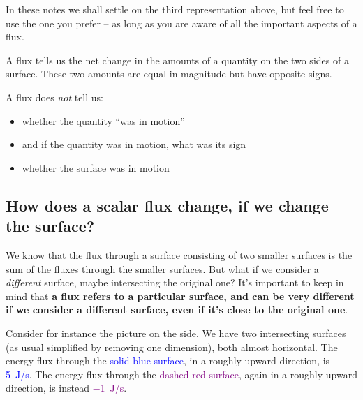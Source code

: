\documentclass[a4paper,12pt,%
onecolumn,oneside,titlepage,%
british%
]{memoir}
\renewcommand*{\|}[1][]{\nonscript\:#1\vert\nonscript\:\mathopen{}}
\begin{document}
In these notes we shall settle on the third representation above, but feel free to use the one you prefer -- as long as you are aware of all the important aspects of a flux.
\begin{warning}
  A flux tells us the net change in the amounts of a quantity on the two sides of a surface. These two amounts are equal in magnitude but have opposite signs.

  \smallskip

  A flux does \emph{not} tell us:
  \begin{itemize}\tightlist
  \item whether the quantity \enquote{was in motion}
  \item \textellipsis and if the quantity was in motion, what was its sign
  \item whether the surface was in motion
  \end{itemize}
\end{warning}

\subsection{How does a scalar flux change, if we change the surface?}
\label{sec:surface_change_scalar}

We know that the flux through a surface consisting of two smaller surfaces is the sum of the fluxes through the smaller surfaces. But what if we consider a \emph{different} surface, maybe intersecting the original one? It's important to keep in mind that \textbf{a flux refers to a particular surface, and can be very different if we consider a different surface, even if it's close to the original one}.

\pagebreak

Consider for instance the picture on the side.
%
%
We have two intersecting surfaces (as usual simplified by removing one dimension), both almost horizontal. The energy flux through the \textcolor{blue}{solid blue surface}, in a roughly upward direction, is \textcolor{blue}{\qty{+5}{J/s}}. The energy flux through the \textcolor{purple}{dashed red surface}, again in a roughly upward direction, is instead \textcolor{purple}{\qty{-1}{J/s}}.
\end{document}

